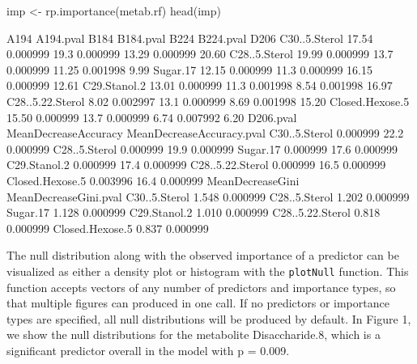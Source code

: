 \begin{Schunk}
\begin{Sinput}
imp <- rp.importance(metab.rf)
head(imp)
\end{Sinput}
\begin{Soutput}
                  A194 A194.pval B184 B184.pval  B224 B224.pval  D206
C30..5.Sterol    17.54  0.000999 19.3  0.000999 13.29  0.000999 20.60
C28..5.Sterol    19.99  0.000999 13.7  0.000999 11.25  0.001998  9.99
Sugar.17         12.15  0.000999 11.3  0.000999 16.15  0.000999 12.61
C29.Stanol.2     13.01  0.000999 11.3  0.001998  8.54  0.001998 16.97
C28..5.22.Sterol  8.02  0.002997 13.1  0.000999  8.69  0.001998 15.20
Closed.Hexose.5  15.50  0.000999 13.7  0.000999  6.74  0.007992  6.20
                 D206.pval MeanDecreaseAccuracy MeanDecreaseAccuracy.pval
C30..5.Sterol     0.000999                 22.2                  0.000999
C28..5.Sterol     0.000999                 19.9                  0.000999
Sugar.17          0.000999                 17.6                  0.000999
C29.Stanol.2      0.000999                 17.4                  0.000999
C28..5.22.Sterol  0.000999                 16.5                  0.000999
Closed.Hexose.5   0.003996                 16.4                  0.000999
                 MeanDecreaseGini MeanDecreaseGini.pval
C30..5.Sterol               1.548              0.000999
C28..5.Sterol               1.202              0.000999
Sugar.17                    1.128              0.000999
C29.Stanol.2                1.010              0.000999
C28..5.22.Sterol            0.818              0.000999
Closed.Hexose.5             0.837              0.000999
\end{Soutput}
\end{Schunk}

The null distribution along with the observed importance of a predictor
can be visualized as either a density plot or histogram with the
\texttt{plotNull} function. This function accepts vectors of any number
of predictors and importance types, so that multiple figures can
produced in one call. If no predictors or importance types are
specified, all null distributions will be produced by default. In Figure
1, we show the null distributions for the metabolite Disaccharide.8,
which is a significant predictor overall in the model with p = 0.009.


